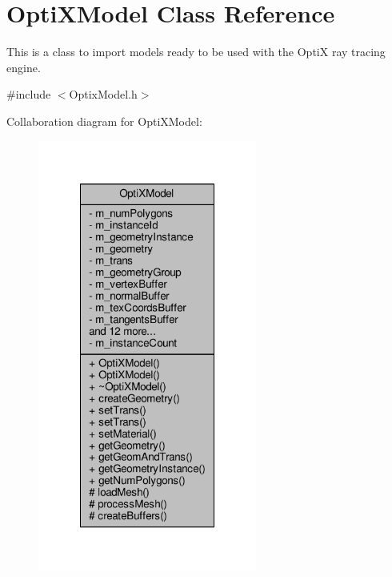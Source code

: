 \hypertarget{class_opti_x_model}{\section{Opti\-X\-Model Class Reference}
\label{class_opti_x_model}
}


This is a class to import models ready to be used with the Opti\-X ray tracing engine.  




{\ttfamily \#include $<$Optix\-Model.\-h$>$}



Collaboration diagram for Opti\-X\-Model\-:
\nopagebreak
\begin{figure}[H]
\begin{center}
\leavevmode
\includegraphics[width=204pt]{class_opti_x_model__coll__graph}
\end{center}
\end{figure}
